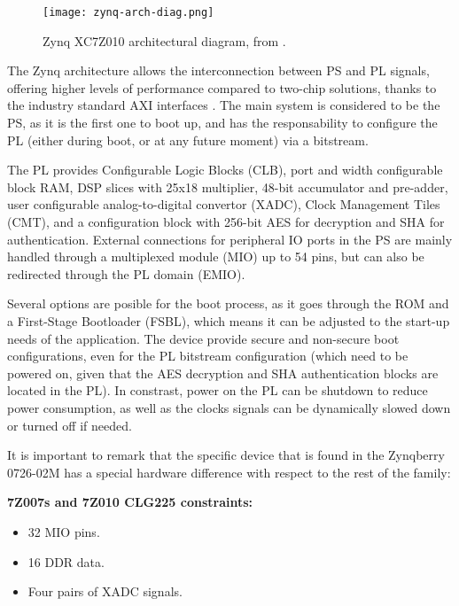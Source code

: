 \begin{figure}[htp]
	\centering
	\texttt{[image: zynq-arch-diag.png]}
	\caption{Zynq XC7Z010 architectural diagram, from \cite{DS190}.} \label{fig:zynq-arch-diag}
\end{figure}

The Zynq architecture allows the interconnection between PS  and PL signals, offering higher levels
of performance compared to two-chip solutions, thanks to the industry standard AXI interfaces
\cite{Crokett2014}. The main system is considered to be the PS, as it is the first one to boot up,
and has the responsability to configure the PL (either during boot, or at any future moment) via a
bitstream.

The PL provides Configurable Logic Blocks (CLB), port and width configurable block RAM, DSP slices
with 25x18 multiplier, 48-bit accumulator and pre-adder, user configurable analog-to-digital
convertor (XADC), Clock Management Tiles (CMT), and a configuration block with 256-bit AES for
decryption and SHA for authentication. External connections for peripheral IO ports in the PS are
mainly handled through a multiplexed module (MIO) up to 54 pins, but can also be redirected through
the PL domain (EMIO).

Several options are posible for the boot process, as it goes through the ROM and a First-Stage
Bootloader (FSBL), which means it can be adjusted to the start-up needs of the application. The
device provide secure and non-secure boot configurations, even for the PL bitstream configuration
(which need to be powered on, given that the AES decryption and SHA authentication blocks are
located in the PL). In constrast, power on the PL can be shutdown to reduce power consumption, as
well as the clocks signals can be dynamically slowed down or turned off if needed.

It is important to remark that the specific device that is found in the Zynqberry 0726-02M has a
special hardware difference with respect to the rest of the family:
\begin{quote} 
	\centering 
\end{quote}
\textbf{7Z007s and 7Z010 CLG225 constraints:}
\begin{itemize}
	\item 32 MIO pins.
	\item 16 DDR data.
	\item Four pairs of XADC signals.
\end{itemize}

